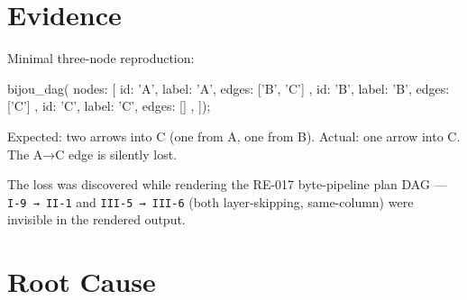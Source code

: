 \section{Evidence}\label{record-289-evidence}

Minimal three-node reproduction:



\begin{CodeBlock}
bijou_dag({ nodes: [
  { id: 'A', label: 'A', edges: ['B', 'C'] },
  { id: 'B', label: 'B', edges: ['C'] },
  { id: 'C', label: 'C', edges: [] },
]});
\end{CodeBlock}

Expected: two arrows into C (one from A, one from B). Actual: one arrow into C. The A→C edge is silently lost.

The loss was discovered while rendering the RE-017 byte-pipeline plan DAG --- \texttt{I\allowbreak{}-\allowbreak{}9\allowbreak{} \allowbreak{}→\allowbreak{} \allowbreak{}I\allowbreak{}I\allowbreak{}-\allowbreak{}1} and \texttt{I\allowbreak{}I\allowbreak{}I\allowbreak{}-\allowbreak{}5\allowbreak{} \allowbreak{}→\allowbreak{} \allowbreak{}I\allowbreak{}I\allowbreak{}I\allowbreak{}-\allowbreak{}6} (both layer-skipping, same-column) were invisible in the rendered output.

\section{Root Cause}\label{record-289-root-cause}

